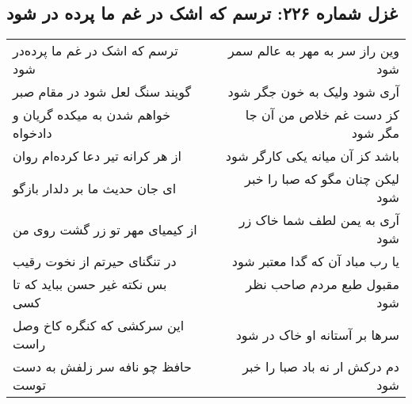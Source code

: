\begin{center}
\section*{غزل شماره ۲۲۶: ترسم که اشک در غم ما پرده در شود}
\label{sec:sh226}
\begin{longtable}{l p{0.5cm} r}
ترسم که اشک در غم ما پرده‌در شود
&&
وین راز سر به مهر به عالم سمر شود
\\
گویند سنگ لعل شود در مقام صبر
&&
آری شود ولیک به خون جگر شود
\\
خواهم شدن به میکده گریان و دادخواه
&&
کز دست غم خلاص من آن جا مگر شود
\\
از هر کرانه تیر دعا کرده‌ام روان
&&
باشد کز آن میانه یکی کارگر شود
\\
ای جان حدیث ما بر دلدار بازگو
&&
لیکن چنان مگو که صبا را خبر شود
\\
از کیمیای مهر تو زر گشت روی من
&&
آری به یمن لطف شما خاک زر شود
\\
در تنگنای حیرتم از نخوت رقیب
&&
یا رب مباد آن که گدا معتبر شود
\\
بس نکته غیر حسن بباید که تا کسی
&&
مقبول طبع مردم صاحب نظر شود
\\
این سرکشی که کنگره کاخ وصل راست
&&
سرها بر آستانه او خاک در شود
\\
حافظ چو نافه سر زلفش به دست توست
&&
دم درکش ار نه باد صبا را خبر شود
\\
\end{longtable}
\end{center}
